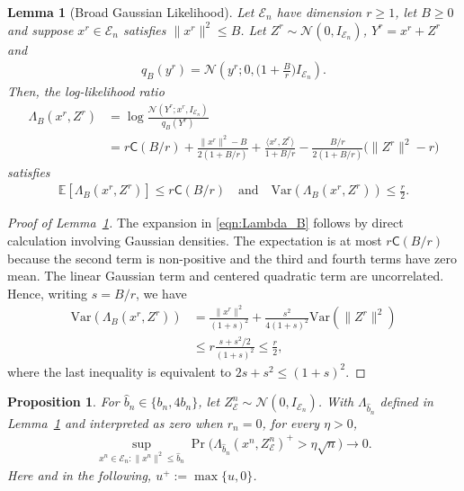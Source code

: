 \documentclass[11pt,onecolumn]{IEEEtran}
\newcommand{\nn}{\nonumber}
\newcommand{\calE}{\mathcal{E}}
\newcommand{\calN}{\mathcal{N}}
\newcommand{\bbE}{\mathbb{E}}
\newcommand{\rvC}{\mathsf{C}}
\newcommand{\hatb}{\hat{b}}
\newtheorem{lemma}[theorem]{Lemma}
\newtheorem{proposition}[theorem]{Proposition}
\begin{document}
\begin{lemma}[Broad Gaussian Likelihood] \label{lem:broad_gauss}
    Let $\calE_n$ have dimension $r\ge1$, let $B\ge 0$ and suppose $x^r\in \calE_n$ satisfies $\|x^r\|^2\le B$. Let $Z^r\sim\calN(0,I_{\calE_n})$, $Y^r=x^r+Z^r$ and 
    \begin{align}
        q_B (y^r)= \calN\left(y^r;0,\Big( 1+\frac{B}{r}\Big) I_{\calE_n}\right).
    \end{align}
    Then, the log-likelihood ratio 
    \begin{align}
        \Lambda_B(x^r,Z^r) &= \log\frac{\calN(Y^r;x^r, I_{\calE_n})}{q_B  (Y^r)} \nn\\
        &=r\rvC(B/r)+ \frac{ \|x^r\|^2-B}{2(1+B/r)}+ \frac{\langle x^r,Z^r\rangle}{1+B/r}- \frac{B/r}{2(1+B/r)} \big(\|Z^r\|^2-r\big) \label{eqn:Lambda_B}
    \end{align}
    satisfies
    \begin{align}
        \bbE[ \Lambda_B(x^r,Z^r)]\le r\rvC(B/r)\quad\mbox{and}\quad \mathrm{Var}( \Lambda_B(x^r,Z^r))\le\frac{r}{2}.
    \end{align}
\end{lemma}

\begin{proof}[Proof of Lemma~\ref{lem:broad_gauss}]
    The expansion in  \eqref{eqn:Lambda_B} follows by direct calculation involving Gaussian densities. The expectation is at most $r\rvC(B/r)$ because the second term is non-positive and the  third and fourth  terms  have zero mean.  The linear Gaussian term and centered quadratic term are uncorrelated.  Hence, writing $s=B/r$, we have
    \begin{align}
        \mathrm{Var}( \Lambda_B(x^r,Z^r))&=\frac{\|x^r\|^2}{(1+s)^2}+\frac{s^2}{4(1+s)^2}\mathrm{Var} ( \|Z^r\|^2)\\
        &\le r\frac{s+s^2/2}{(1+s)^2}\le\frac{r}{2},
    \end{align}
    where the last inequality is equivalent to $2s+s^2\le (1+s)^2$.
\end{proof}


\begin{proposition} \label{prop:excep_likeli}
    For $\hatb_n \in \{b_n,4b_n\}$, let $Z_\calE^n\sim\calN(0,I_{\calE_n})$. With $\Lambda_{\hatb_n}$ defined in Lemma~\ref{lem:broad_gauss}  and interpreted as zero when $r_n=0$, for every $\eta>0$,
    \begin{align}
        \sup_{x^n \in \calE_n : \|x^n\|^2\le\hatb_n}\Pr\big( \Lambda_{\hatb_n}(x^n,Z_\calE^n)^+>\eta\sqrt{n} \big)\to0. \label{eqn:prop_cheby}
    \end{align}
    Here and in the following, $u^+:=\max\{u,0\}$. 
\end{proposition}
\end{document}
